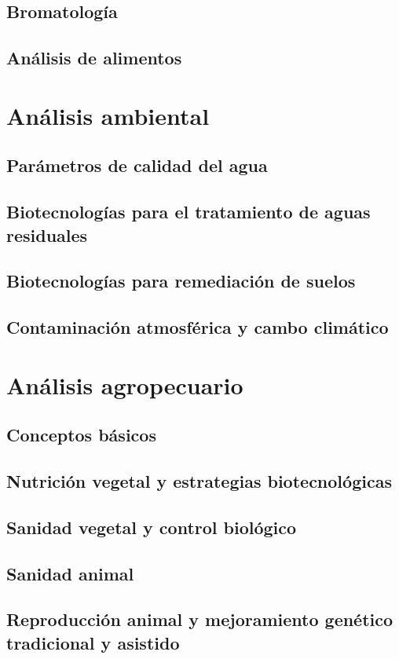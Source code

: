 \documentclass{../summarie}
\begin{document}
    \chapter{Bromatología}
    \chapter{Análisis de alimentos}
        

\part{Análisis ambiental}

    \chapter{Parámetros de calidad del agua}
    \chapter{Biotecnologías para el tratamiento de aguas residuales}
    \chapter{Biotecnologías para remediación de suelos}
    \chapter{Contaminación atmosférica y cambo climático}

\part{Análisis agropecuario}

    \chapter{Conceptos básicos}
    \chapter{Nutrición vegetal y estrategias biotecnológicas}
    \chapter{Sanidad vegetal y control biológico}
    \chapter{Sanidad animal}
    \chapter{Reproducción animal y mejoramiento genético tradicional y asistido}


\newpage


\end{document}
